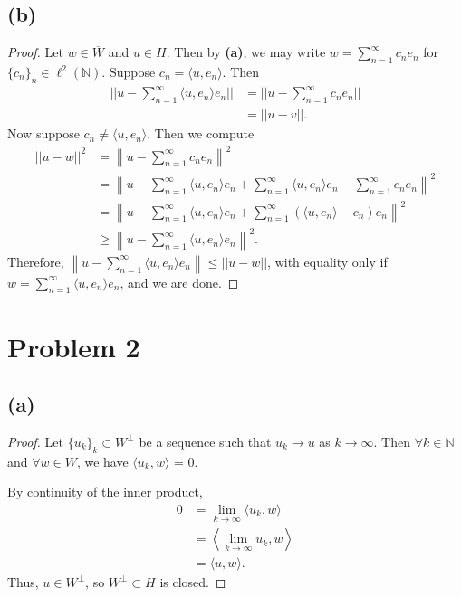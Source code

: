 \documentclass{article}
\newcommand{\N}{\mathbb{N}} %
\begin{document}
\subsection*{(b)}
\begin{proof}
	Let $w \in \overline{W}$ and $u \in H$. Then by \textbf{(a)}, we may write $w = \sum_{n=1}^{\infty} c_n e_n$ for $\{c_n\}_n \in \ell^2(\N)$. Suppose $c_n = \langle u, e_n \rangle$. Then
	\begin{align}
		||u - \sum_{n=1}^{\infty} \langle u, e_n \rangle e_n|| &= ||u - \sum_{n=1}^{\infty} c_n e_n || \\
		&= ||u - v||.
	\end{align}
	Now suppose $c_n \neq \langle u, e_n \rangle$. Then we compute
	\begin{align}
		||u - w||^2 &= \left\|u - \sum_{n=1}^{\infty} c_n e_n \right\|^2 \\
		&= \left\|u - \sum_{n=1}^{\infty} \langle u, e_n \rangle e_n + \sum_{n=1}^{\infty} \langle u, e_n \rangle e_n - \sum_{n=1}^{\infty}c_n e_n\right\|^2 \\
		&= \left\|u - \sum_{n=1}^{\infty} \langle u, e_n \rangle e_n + \sum_{n=1}^{\infty}(\langle u, e_n \rangle - c_n)e_n\right\|^2 \\
		& \geq \left\|u - \sum_{n=1}^{\infty} \langle u, e_n \rangle e_n \right\|^2.
	\end{align}
	Therefore, $\left\|u - \sum_{n=1}^{\infty} \langle u, e_n \rangle e_n\right\| \leq ||u - w||$, with equality only if \\$w = \sum_{n=1}^{\infty} \langle u, e_n \rangle e_n$, and we are done.
\end{proof}
\section*{Problem 2}
\subsection*{(a)}
\begin{proof}
	Let $\{u_k\}_k \subset W^{\perp}$ be a sequence such that $u_k \to u$ as $k \to \infty$. Then $\forall k \in \N$ and $\forall w \in W$, we have $\langle u_k, w \rangle$ = 0.
	
	By continuity of the inner product, 
	\begin{align}
		0 &= \lim\limits_{k \to \infty} \langle u_k, w\rangle \\
		&= \left\langle \lim\limits_{k \to \infty} u_k, w \right \rangle \\
		&= \langle u, w \rangle.
	\end{align}
	Thus, $u \in W^\perp$, so $W^{\perp} \subset H$ is closed.
\end{proof}
\end{document}
